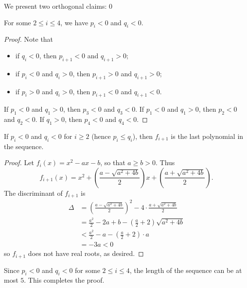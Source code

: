 We present two orthogonal claims:
\setcounter{iclaim}0
\begin{iclaim}
    For some $2\le i\le4$, we have $p_i<0$ and $q_i<0$.
\end{iclaim}
\begin{proof}
    Note that
    \begin{itemize}[itemsep=0em]
        \item if $q_i<0$, then $p_{i+1}<0$ and $q_{i+1}>0$;
        \item if $p_i<0$ and $q_i>0$, then $p_{i+1}>0$ and $q_{i+1}>0$;
        \item if $p_i>0$ and $q_i>0$, then $p_{i+1}<0$ and $q_{i+1}<0$.
    \end{itemize}
    If $p_1<0$ and $q_1>0$, then $p_3<0$ and $q_3<0$. If $p_1<0$ and $q_1>0$, then $p_2<0$ and $q_2<0$. If $q_1>0$, then $p_4<0$ and $q_4<0$.
\end{proof}
\begin{iclaim}
    If $p_i<0$ and $q_i<0$ for $i\ge2$ (hence $p_i\le q_i$), then $f_{i+1}$ is the last polynomial in the sequence.
\end{iclaim}
\begin{proof}
    Let $f_i(x)=x^2-ax-b$, so that $a\ge b>0$. Thus \[f_{i+1}(x)=x^2+\left(\frac{a-\sqrt{a^2+4b}}2\right)x+\left(\frac{a+\sqrt{a^2+4b}}2\right).\]
    The discriminant of $f_{i+1}$ is
    \begin{align*}
        \Delta&=\left(\frac{a-\sqrt{a^2+4b}}2\right)^2-4\cdot\frac{a+\sqrt{a^2+4b}}2\\
        &=\frac{a^2}2-2a+b-\left(\frac a2+2\right)\sqrt{a^2+4b}\\
        &<\frac{a^2}2-a-\left(\frac a2+2\right)\cdot a\\
        &=-3a<0
    \end{align*}
    so $f_{i+1}$ does not have real roots, as desired.
\end{proof}

Since $p_i<0$ and $q_i<0$ for some $2\le i\le 4$, the length of the sequence can be at most $5$. This completes the proof.

